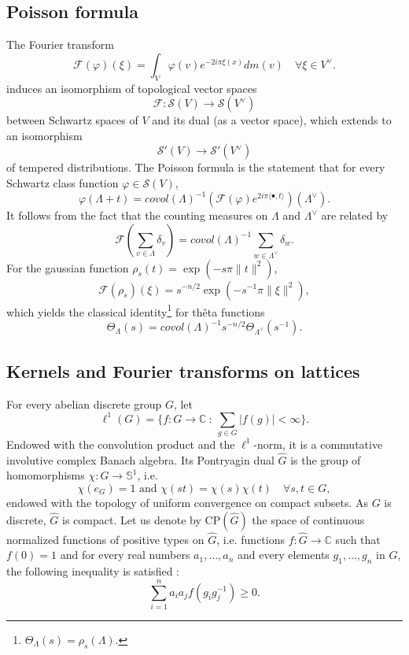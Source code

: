 \documentclass{article}
\begin{document}
\subsection{Poisson formula}
The Fourier transform
\[\mathcal F(\varphi ) (\xi ) = \int_V \varphi(v)e^{-2i\pi \xi(x)} dm(v) \quad\forall \xi \in V^\vee.\]
induces an isomorphism of topological vector spaces
\[\mathcal F : \mathcal S(V) \rightarrow \mathcal S(V^\vee)\]
between Schwartz spaces of $V$ and its dual (as a vector space), which extends to an isomorphism
\[\mathcal S'(V) \rightarrow \mathcal S'(V^\vee)\]
of tempered distributions.
The Poisson formula is the statement that for every Schwartz class function $\varphi\in\mathcal S(V)$, 
\[ \varphi (\Lambda + t) = covol(\Lambda)^{-1}(\mathcal F(\varphi)e^{2i\pi \langle \bullet , t\rangle }) (\Lambda^\vee).\]
It follows from the fact that the counting measures on $\Lambda$ and $\Lambda^\vee$ are related by 
\[\mathcal F(\sum_{v\in \Lambda} \delta_{v} ) = covol(\Lambda)^{-1}\sum_{w\in \Lambda^\vee} \delta_w .\]
For the gaussian function $\rho_s(t) = \exp(-s\pi\|t\|^2)$, 
\[\mathcal F(\rho_s)(\xi)= s^{-n/2}\exp(-s^{-1}\pi\|\xi\|^2 ),\]
which yields the classical identity\footnote{$\Theta_{\Lambda}(s) = \rho_s(\Lambda)$.} for thêta functions
\[ \Theta_{\Lambda}(s) = covol(\Lambda)^{-1}s^{-n/2}\Theta_{\Lambda^\vee}(s^{-1}).\]

\subsection{Kernels and Fourier transforms on lattices} %

For every abelian discrete group $G$, let 
\[\ell^1(G) = \{ f : G \rightarrow \mathbb C \ :\ \sum_{g\in G}|f(g)| < \infty \}.\]
Endowed with the convolution product and the $\ell^1$-norm, it is a commutative involutive complex Banach algebra. Its Pontryagin dual $\hat G$ is the group of homomorphisms $\chi : G\rightarrow \mathbb S^1$, i.e.
\[\chi(e_G ) = 1 \text{ and } \chi(st) = \chi(s)\chi(t) \quad \forall s,t \in G,\]
endowed with the topology of uniform convergence on compact subsets. As $G$ is discrete, $\hat G$ is compact. Let us denote by CP$(\hat G)$ the space of continuous normalized functions of positive types on $\hat G$, i.e. functions $f : \hat G \rightarrow \mathbb C$ such that $f(0) = 1$ and for every real numbers $a_1,\ldots , a_n$ and every elements $g_1,\ldots , g_n$ in $G$, the following inequality is satisfied :
\[\sum_{i=1}^n a_i a_j f(g_ig_j^{-1})\geq 0.\] 
 
\end{document}
